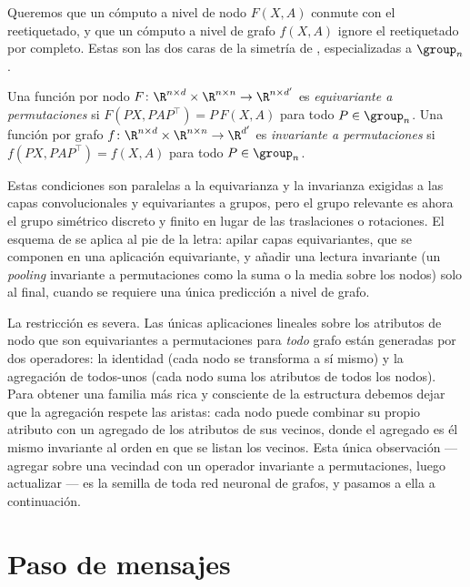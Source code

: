 Queremos que un c\'omputo a nivel de nodo $F(X, A)$ conmute con el reetiquetado, y
que un c\'omputo a nivel de grafo $f(X, A)$ ignore el reetiquetado por completo.
Estas son las dos caras de la simetr\'ia de , especializadas a
$\group_n$.

\begin{definition}
\label{def:graphs:equiv-inv}
Una funci\'on por nodo $F \colon \R^{n \times d} \times \R^{n \times n} \to
\R^{n \times d'}$ es \emph{equivariante a permutaciones} si
$F(P X, P A P^\top) = P\, F(X, A)$ para todo $P \in \group_n$. Una funci\'on por
grafo $f \colon \R^{n \times d} \times \R^{n \times n} \to \R^{d'}$ es
\emph{invariante a permutaciones} si $f(P X, P A P^\top) = f(X, A)$ para todo
$P \in \group_n$.
\end{definition}

Estas condiciones son paralelas a la equivarianza y la invarianza exigidas a las
capas convolucionales y equivariantes a grupos, pero el grupo relevante es ahora
el grupo sim\'etrico discreto y finito en lugar de las traslaciones o rotaciones.
El esquema de  se aplica al pie de la letra: apilar capas
equivariantes, que se componen en una aplicaci\'on equivariante, y a\~nadir una
lectura invariante (un \emph{pooling} invariante a permutaciones como la suma o la
media sobre los nodos) solo al final, cuando se requiere una \'unica predicci\'on
a nivel de grafo.

La restricci\'on es severa. Las \'unicas aplicaciones lineales sobre los atributos
de nodo que son equivariantes a permutaciones para \emph{todo} grafo est\'an
generadas por dos operadores: la identidad (cada nodo se transforma a s\'i mismo)
y la agregaci\'on de todos-unos (cada nodo suma los atributos de todos los nodos).
Para obtener una familia m\'as rica y consciente de la estructura debemos dejar
que la agregaci\'on respete las aristas: cada nodo puede combinar su propio
atributo con un agregado de los atributos de sus vecinos, donde el agregado es \'el
mismo invariante al orden en que se listan los vecinos. Esta \'unica observaci\'on
--- agregar sobre una vecindad con un operador invariante a permutaciones, luego
actualizar --- es la semilla de toda red neuronal de grafos, y pasamos a ella a
continuaci\'on.

\section{Paso de mensajes}
\label{sec:graphs:message-passing}

